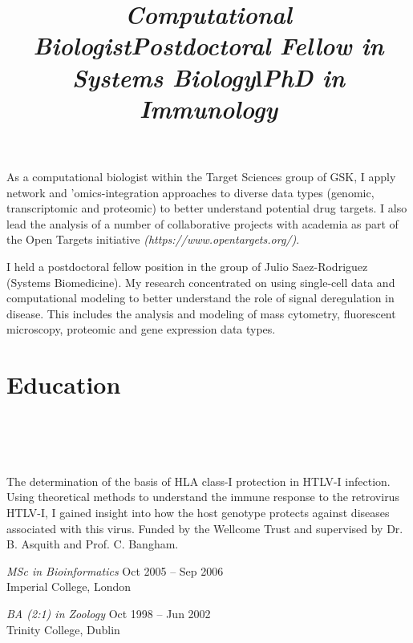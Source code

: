 \documentclass[overlapped, line, 11pt, letterpaper]{res}
\begin{document}
\begin{resume}
\title{\it Computational Biologist} 
\begin{position}
As a computational biologist within the Target Sciences group of GSK, I apply network and 'omics-integration approaches to diverse data types (genomic, transcriptomic and proteomic) to better understand potential drug targets. I also lead the analysis of a number of collaborative projects with academia as part of the Open Targets initiative \emph{(https://www.opentargets.org/)}. 
\end{position}

\title{\it Postdoctoral Fellow in Systems Biology} 
\begin{position}
I held a postdoctoral fellow position in the group of Julio Saez-Rodriguez (Systems Biomedicine). My research concentrated on using single-cell data and computational modeling to better understand the role of signal deregulation in disease. This includes the analysis and modeling of mass cytometry, fluorescent microscopy, proteomic and gene expression data types.
\end{position}

\section{\bf Education}
\begin{formatb}
\title{l} \\
\\
\body \\
\end{formatb}

\title{\it PhD in Immunology} 
\begin{position}
The determination of the basis of HLA class-I protection in HTLV-I infection. Using theoretical methods to understand the immune response to the retrovirus HTLV-I, I gained insight into how the host genotype protects against diseases associated with this virus. Funded by the Wellcome Trust and supervised by Dr. B. Asquith and Prof. C. Bangham.
\end{position}

\emph{MSc in Bioinformatics} \hfill Oct 2005 -- Sep 2006\\
Imperial College, London
 
\emph{BA (2:1) in Zoology} \hfill Oct 1998 -- Jun 2002\\
Trinity College, Dublin


\end{resume}
\end{document}
